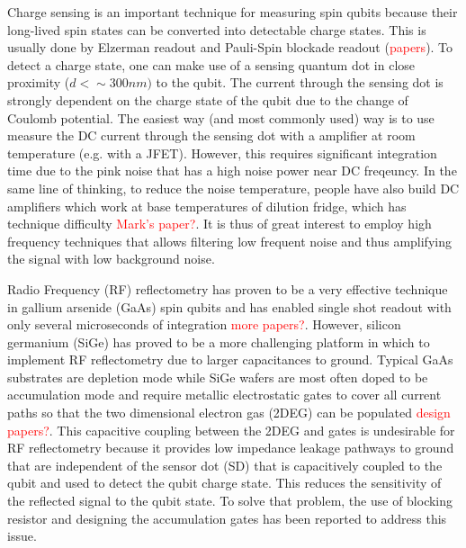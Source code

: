 \documentclass[twocolumn]{article}
\begin{document}
	Charge sensing is an important technique for measuring spin qubits because their long-lived spin states can be converted into detectable charge states.  This is usually done by Elzerman readout and Pauli-Spin blockade readout (\textcolor{red}{papers}). To detect a charge state, one can make use of a sensing quantum dot in close proximity ($d < \sim  300nm)$ to the qubit. The current through the sensing dot is strongly dependent on the charge state of the qubit due to the change of Coulomb potential.
	The easiest way (and most commonly used) way is to use measure the DC current through the sensing dot with a amplifier at room temperature (e.g. with a JFET). However, this requires significant integration time due to the pink noise that has a high noise power near DC freqeuncy.
	In the same line of thinking, to reduce the noise temperature, people have also build DC amplifiers which work at base temperatures of dilution fridge, which has technique difficulty \textcolor{red}{Mark's paper?}. It is thus of great interest to employ high frequency techniques that allows filtering low frequent noise and thus amplifying the signal with low background noise. %
	
	Radio Frequency (RF) reflectometry has proven to be a very effective technique in gallium arsenide (GaAs) spin qubits and has enabled single shot readout with only several microseconds of integration \cite{Schoelkopf1998} \textcolor{red}{more papers?}. However, silicon germanium (SiGe) has proved to be a more challenging platform in which to implement RF reflectometry due to larger capacitances to ground. Typical GaAs substrates are depletion mode while SiGe wafers are most often doped to be accumulation mode and require metallic electrostatic gates to cover all current paths so that the two dimensional electron gas (2DEG) can be populated \textcolor{red}{design papers?}. This capacitive coupling between the 2DEG and gates is undesirable for RF reflectometry because it provides low impedance leakage pathways to ground that are independent of the sensor dot (SD) that is capacitively coupled to the qubit and used to detect the qubit charge state. This reduces the sensitivity of the reflected signal to the qubit state. To solve that problem, the use of blocking resistor \cite{Volk2019} and  designing the accumulation gates \cite{Connors2020} has been reported to address this issue. %
	
\end{document}
